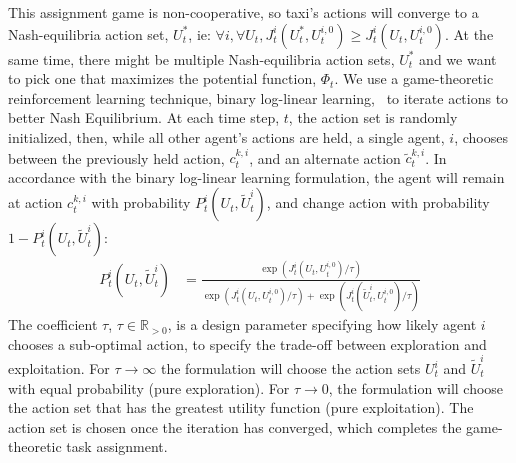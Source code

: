 \documentclass[journal]{IEEEtran}
\begin{document}
This assignment game is non-cooperative, so taxi's actions will converge to a Nash-equilibria action set, $U^*_t$, ie: $\forall i, \forall U_t, J^i_t(U^*_t, U^{i,0}_t) \geq J^i_t(U_t, U^{i,0}_t)$. At the same time, there might be multiple Nash-equilibria action sets, $U^*_t$ and we want to pick one that maximizes the potential function, $\Phi_t$. We use a game-theoretic reinforcement learning technique, binary log-linear learning,~\cite{revisiting} to iterate actions to better Nash Equilibrium. At each time step, $t$, the action set is randomly initialized, then, while all other agent's actions are held, a single agent, $i$, chooses between the previously held action, $c^{k,i}_t$, and an alternate action $\tilde{c}^{k,i}_t$. In accordance with the binary log-linear learning formulation, the agent will remain at action $c^{k,i}_t$ with probability $P^i_t(U_t, \tilde{U}^i_t)$, and change action with probability $1-P^i_t(U_t, \tilde{U}^i_t)$:
\begin{align}
    \label{eq:blll}
    P^i_t(U_t, \tilde{U}^i_t) &= \frac{ \exp{(J^i_t( U_t, U^{i,0}_t)/\tau)} }{ \exp{(J^i_t( U_t, U^{i,0}_t)/\tau)} + \exp{(J^i_t( \tilde{U}^i_t, U^{i,0}_t)/\tau)}} 
\end{align}
The coefficient $\tau$, $\tau \in \mathbb{R}_{>0}$, is a design parameter specifying how likely agent $i$ chooses a sub-optimal action, to specify the trade-off between exploration and exploitation. For $\tau \rightarrow \infty$ the formulation will choose the action sets $U^i_t$ and $\tilde{U}^i_t$ with equal probability (pure exploration). For $\tau \rightarrow 0$, the formulation will choose the action set that has the greatest utility function (pure exploitation). The action set is chosen once the iteration has converged, which completes the game-theoretic task assignment. 
\end{document}
